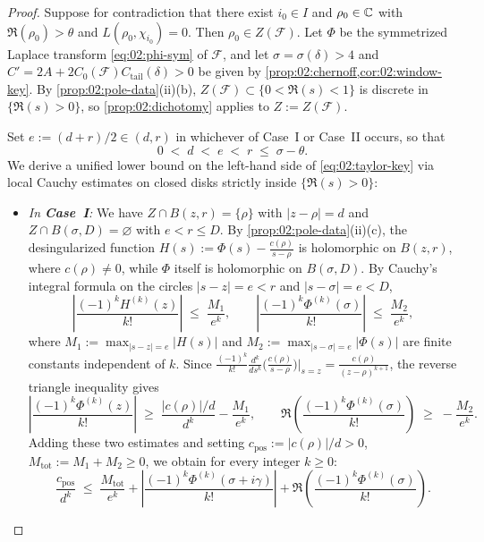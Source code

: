 \begin{proof}
Suppose for contradiction that there exist $i_0 \in I$ and $\rho_0 \in \mathbb{C}$ with $\Re(\rho_0) > \theta$ and $L(\rho_0, \chi_{i_0}) = 0$. Then $\rho_0 \in Z(\mathcal{F})$. Let $\Phi$ be the symmetrized Laplace transform \eqref{eq:02:phi-sym} of $\mathcal{F}$, and let $\sigma = \sigma(\delta) > 4$ and $C' = 2A + 2C_0(\mathcal{F})C_{\mathrm{tail}}(\delta) > 0$ be given by \cref{prop:02:chernoff,cor:02:window-key}. By \cref{prop:02:pole-data}(ii)(b), $Z(\mathcal{F}) \subset \{0 < \Re(s) < 1\}$ is discrete in $\{\Re(s) > 0\}$, so \cref{prop:02:dichotomy} applies to $Z := Z(\mathcal{F})$.

Set $e := (d + r)/2 \in (d, r)$ in whichever of Case~I or Case~II occurs, so that
\[
  0 \;<\; d \;<\; e \;<\; r \;\le\; \sigma - \theta.
\]
We derive a unified lower bound on the left-hand side of \eqref{eq:02:taylor-key} via local Cauchy estimates on closed disks strictly inside $\{\Re(s) > 0\}$:

\begin{itemize}
\item \emph{In \textbf{Case~I}:} We have $Z \cap B(z, r) = \{\rho\}$ with $|z - \rho| = d$ and $Z \cap B(\sigma, D) = \varnothing$ with $e < r \le D$. By \cref{prop:02:pole-data}(ii)(c), the desingularized function $H(s) := \Phi(s) - \frac{c(\rho)}{s-\rho}$ is holomorphic on $B(z, r)$, where $c(\rho) \neq 0$, while $\Phi$ itself is holomorphic on $B(\sigma, D)$. By Cauchy's integral formula on the circles $|s - z| = e < r$ and $|s - \sigma| = e < D$,
  \[
    \left|\frac{(-1)^k H^{(k)}(z)}{k!}\right| \;\le\; \frac{M_1}{e^k}, \qquad
    \left|\frac{(-1)^k \Phi^{(k)}(\sigma)}{k!}\right| \;\le\; \frac{M_2}{e^k},
  \]
  where $M_1 := \max_{|s-z|=e} |H(s)|$ and $M_2 := \max_{|s-\sigma|=e} |\Phi(s)|$ are finite constants independent of $k$. Since $\frac{(-1)^k}{k!}\frac{d^k}{ds^k}\bigl(\frac{c(\rho)}{s-\rho}\bigr)\big|_{s=z} = \frac{c(\rho)}{(z-\rho)^{k+1}}$, the reverse triangle inequality gives
  \[
    \left|\frac{(-1)^k \Phi^{(k)}(z)}{k!}\right| \;\ge\; \frac{|c(\rho)|/d}{d^k} - \frac{M_1}{e^k}, \qquad
    \Re\!\left(\frac{(-1)^k \Phi^{(k)}(\sigma)}{k!}\right) \;\ge\; -\frac{M_2}{e^k}.
  \]
  Adding these two estimates and setting $c_{\mathrm{pos}} := |c(\rho)|/d > 0$, $M_{\mathrm{tot}} := M_1 + M_2 \ge 0$, we obtain for every integer $k \ge 0$:
  \begin{equation}
  \label{eq:02:lower-taylor}
    \frac{c_{\mathrm{pos}}}{d^k} \;\le\; \frac{M_{\mathrm{tot}}}{e^k}
    + \left|\frac{(-1)^k \Phi^{(k)}(\sigma + i\gamma)}{k!}\right|
    + \Re\!\left(\frac{(-1)^k \Phi^{(k)}(\sigma)}{k!}\right).
  \end{equation}


\end{itemize}
\end{proof}
